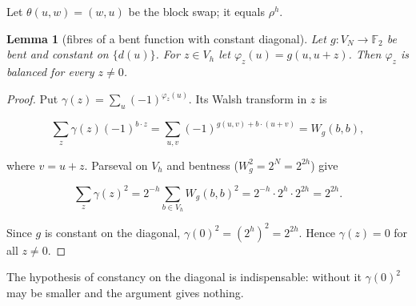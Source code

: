 \documentclass[11pt,reqno]{amsart}
\newtheorem{lemma}{Lemma}[section]
\begin{document}
Let $\theta(u,w)=(w,u)$ be the block swap; it equals $\rho^h$.

\begin{lemma}[fibres of a bent function with constant diagonal]
Let $g:V_N\to\mathbb F_2$ be bent and constant on $\{d(u)\}$. For $z\in V_h$ let $\varphi_z(u)=g(u,u+z)$. Then $\varphi_z$ is balanced for every $z\ne0$.

\end{lemma}
\begin{proof}
Put $\gamma(z)=\sum_u(-1)^{\varphi_z(u)}$. Its Walsh transform in $z$ is

\begin{equation*}\sum_{z}\gamma(z)(-1)^{b\cdot z}=\sum_{u,v}(-1)^{g(u,v)+b\cdot(u+v)}=W_g(b,b),\end{equation*}

where $v=u+z$. Parseval on $V_h$ and bentness ($W_g^2=2^{N}=2^{2h}$) give

\begin{equation*}\sum_z\gamma(z)^2=2^{-h}\sum_{b\in V_h}W_g(b,b)^2=2^{-h}\cdot2^h\cdot2^{2h}=2^{2h}.\end{equation*}

Since $g$ is constant on the diagonal, $\gamma(0)^2=(2^h)^2=2^{2h}$. Hence $\gamma(z)=0$ for all $z\ne0$.
\end{proof}

The hypothesis of constancy on the diagonal is indispensable: without it $\gamma(0)^2$ may be smaller and the argument gives nothing.
\end{document}

